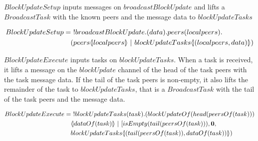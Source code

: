 $BlockUpdateSetup$ inputs messages on $broadcastBlockUpdate$ and lifts a $BroadcastTask$ with the known peers and the message data to $blockUpdateTasks$

\begin{align*}
    BlockUpdateSetup &=\ !broadcastBlockUpdate.(data).peers(localpeers).\\
    &\quad (peers\lift{}{localpeers}\ |\ blockUpdateTasks\lift{}{(localpeers,data)})
\end{align*}

$BlockUpdateExecute$ inputs tasks on $blockUpdateTasks$. When a task is received, it lifts a message on the $blockUpdate$ channel of the head of the task peers with the task message data. If the tail of the task peers is non-empty, it also lifts the remainder of the task to $blockUpdateTasks$, that is a $BroadcastTask$ with the tail of the task peers and the message data.

\begin{align*}
    BlockUpdateExecute &=\ !blockUpdateTasks(task).(blockUpdateOf(head(peersOf(task)))\\
    &\quad \lift{}{dataOf(task)}\ |\ [isEmpty(tail(peersOf(task))),\nil,\\
    &\quad blockUpdateTasks\lift{}{(tail(peersOf(task)),dataOf(task))})
\end{align*}
